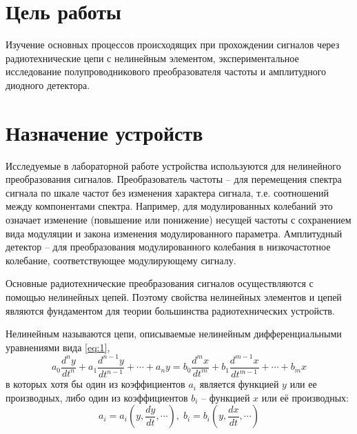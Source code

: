 
\usepackage{xcolor}
\usepackage{float}
\usepackage{hyperref}
\usepackage{tikz}
\usepackage{pgfplots}
\hypersetup{unicode=true}

\hypersetup{pdfstartview=FitH,  linkcolor=linkcolor,urlcolor=urlcolor, colorlinks=true}

	\sloppy
	\def\authors{Есюнин М.В., Есюнин Д.В.}
	\def\labnum{6}
	\def\labname{Исследование нелиненых преобразований сигналов}
	\def\sciadviser{Орлов И.Я.}
	\renewcommand{\vec}{\mathbf}
	\renewcommand{\phi}{\varphi}
	\renewcommand{\kappa}{\varkappa}
	\renewcommand{\Re}{\operatorname{Re}}
	\renewcommand{\Im}{\operatorname{Im}}
	
	\begin{spacing}{1.2}
		\tableofcontents
	\end{spacing}
	
	\newpage
\section{Цель работы}
Изучение основных процессов происходящих при прохождении сигналов через радиотехнические цепи с нелинейным элементом, экспериментальное исследование полупроводникового преобразователя частоты и амплитудного диодного детектора.
\section{Назначение устройств}
Исследуемые в лабораторной работе устройства используются для нелинейного преобразования сигналов. Преобразователь частоты -- для перемещения спектра сигнала по шкале частот без изменения характера сигнала, т.е. соотношений между компонентами спектра. Например, для модулированных колебаний это означает изменение (повышение или понижение) несущей частоты с сохранением вида модуляции и закона изменения модулированного параметра. Амплитудный детектор -- для преобразования модулированного колебания в низкочастотное колебание, соответствующее модулирующему сигналу.

Основные радиотехнические преобразования сигналов осуществляются с помощью нелинейных цепей. Поэтому свойства нелинейных элементов и цепей являются фундаментом для теории большинства радиотехнических устройств.

Нелинейным называются цепи, описываемые нелинейным дифференциальными уравнениями вида \eqref{eq:1},
\begin{equation}
a_0\frac{d^ny}{dt^n}+a_1\frac{d^{n-1}y}{dt^{n-1}}+\cdots+a_ny=b_0\frac{d^mx}{dt^m}+b_1\frac{d^{m-1}x}{dt^{m-1}}+\cdots+b_mx
\label{eq:1}
\end{equation}
в которых хотя бы один из коэффициентов $a_i$ является функцией $y$ или ее производных, либо один из коэффициентов $b_i$ -- функцией $x$ или её производных:
\begin{equation*}
a_i=a_i(y,\frac{dy}{dt},\cdots),\;b_i=b_i(y,\frac{dx}{dt},\cdots)
\end{equation*}

